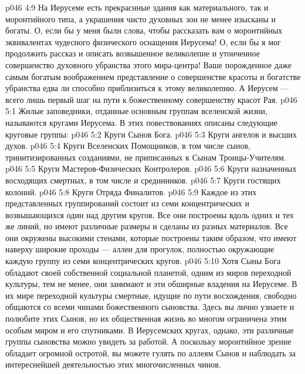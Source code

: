 \vs p046 4:9 На Иерусеме есть прекраснные здания как материального, так и моронтийного типа, а украшения чисто духовных зон не менее изысканы и богаты. О, если бы у меня были слова, чтобы рассказать вам о моронтийных эквивалентах чудесного физического оснащения Иерусема! О, если бы я мог продолжить рассказ и описать возвышенное великолепие и утонченное совершенство духовного убранства этого мира\hyp{}центра! Ваше порожденное даже самым богатым воображением представление о совершенстве красоты и богатстве убранства едва ли способно приблизиться к этому великолепию. А Иерусем --- всего лишь первый шаг на пути к божественному совершенству красот Рая.
\vs p046 5:1 Жилые заповедники, отданные основным группам вселенской жизни, называются кругами Иерусема. В этих повествованиях описаны следующие круговые группы:
\vs p046 5:2 \bibnobreakspace Круги Сынов Бога.
\vs p046 5:3 \bibnobreakspace Круги ангелов и высших духов.
\vs p046 5:4 \bibnobreakspace Круги Вселенских Помощников, в том числе сынов, тринитизированных созданиями, не приписанных к Сынам Троицы\hyp{}Учителям.
\vs p046 5:5 \bibnobreakspace Круги Мастеров\hyp{}Физических Контролеров.
\vs p046 5:6 \bibnobreakspace Круги назначенных восходящих смертных, в том числе и срединников.
\vs p046 5:7 \bibnobreakspace Круги гостящих колоний.
\vs p046 5:8 \bibnobreakspace Круги Отряда Финалитов.
\vs p046 5:9 \pc Каждое из этих представленных группирований состоит из семи концентрических и возвышающихся один над другим кругов. Все они построены вдоль одних и тех же линий, но имеют различные размеры и сделаны из разных материалов. Все они окружены высокими стенами, которые построены таким образом, что имеют наверху широкие проходы --- аллеи для прогулок, полностью окружающие каждую группу из семи концентрических кругов.
\vs p046 5:10 \pc {}\bibnobreakspace {} Хотя Сыны Бога обладают своей собственной социальной планетой, одним из миров переходной культуры, тем не менее, они занимают и эти обширные владения на Иерусеме. В их мире переходной культуры смертные, идущие по пути восхождения, свободно общаются со всеми чинами божественного сыновства. Здесь вы лично узнаете и полюбите этих Сынов, но их общественная жизнь во многом ограничена этим особым миром и его спутниками. В Иерусемских кругах, однако, эти различные группы сыновства можно увидеть за работой. А поскольку моронтийное зрение обладает огромной остротой, вы можете гулять по аллеям Сынов и наблюдать за интереснейшей деятельностью этих многочисленных чинов.

